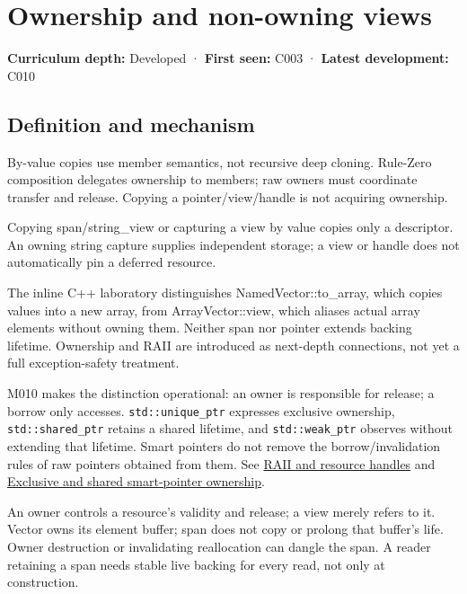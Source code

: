 \hypertarget{appendix-d52e4486f527}{}\label{referencestart:appendix-d52e4486f527}
\section{Ownership and non-owning views}\label{appendix-d52e4486f527-ownership-and-non-owning-views}

\textbf{Curriculum depth:} Developed · \textbf{First seen:} C003 · \textbf{Latest development:} C010

\begin{allmightroledefinition}

\subsection{Definition and mechanism}\label{appendix-d52e4486f527-definition-and-mechanism}

By-value copies use member semantics, not recursive deep cloning. Rule-Zero composition delegates ownership to members; raw owners must coordinate transfer and release. Copying a pointer/view/handle is not acquiring ownership.

\end{allmightroledefinition}

Copying span/string\_view or capturing a view by value copies only a descriptor. An owning string capture supplies independent storage; a view or handle does not automatically pin a deferred resource.

The inline C++ laboratory distinguishes NamedVector::to\_array, which copies values into a new array, from ArrayVector::view, which aliases actual array elements without owning them. Neither span nor pointer extends backing lifetime. Ownership and RAII are introduced as next-depth connections, not yet a full exception-safety treatment.

M010 makes the distinction operational: an owner is responsible for release; a borrow only accesses. \texttt{std::unique\_ptr} expresses exclusive ownership, \texttt{std::shared\_ptr} retains a shared lifetime, and \texttt{std::weak\_ptr} observes without extending that lifetime. Smart pointers do not remove the borrow/invalidation rules of raw pointers obtained from them. See \hyperref[appendix-69739d3ab49b]{RAII and resource handles} and \hyperref[appendix-51602cabe815]{Exclusive and shared smart-pointer ownership}.

An owner controls a resource's validity and release; a view merely refers to it. Vector owns its element buffer; span does not copy or prolong that buffer's life. Owner destruction or invalidating reallocation can dangle the span. A reader retaining a span needs stable live backing for every read, not only at construction.

